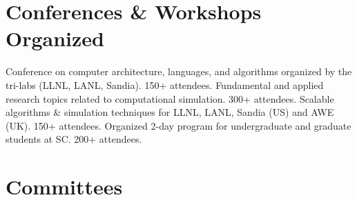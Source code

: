 


\section{Conferences \& Workshops Organized}
		{Conference on computer architecture, languages, and algorithms organized by the tri-labs (LLNL, LANL, Sandia). 150+ attendees.}
		{%
		Fundamental and applied research topics related to %
		computational simulation. 300+ attendees.}
		{Scalable algorithms \& simulation techniques for LLNL, LANL, Sandia (US) and AWE (UK). 150+ attendees.}
		{Organized 2-day program for undergraduate and graduate students at SC. 200+ attendees.}


\section{Committees}

	

